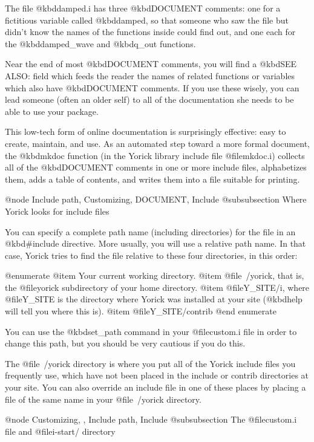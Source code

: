 {The file @kbd{damped.i} has three @kbd{DOCUMENT} comments: one for a
fictitious variable called @kbd{damped}, so that someone who saw the
file but didn't know the names of the functions inside could find out,
and one each for the @kbd{damped_wave} and @kbd{q_out} functions.


Near the end of most @kbd{DOCUMENT} comments, you will find a
@kbd{SEE ALSO:} field which feeds the reader the names of related
functions or variables which also have @kbd{DOCUMENT} comments.  If
you use these wisely, you can lead someone (often an older self) to
all of the documentation she needs to be able to use your package.

This low-tech form of online documentation is surprisingly effective:
easy to create, maintain, and use.  As an automated step toward a more
formal document, the @kbd{mkdoc} function (in the Yorick library include
file @file{mkdoc.i}) collects all of the @kbd{DOCUMENT} comments in one
or more include files, alphabetizes them, adds a table of contents, and
writes them into a file suitable for printing.


@node Include path, Customizing, DOCUMENT, Include
@subsubsection Where Yorick looks for include files

You can specify a complete path name (including directories) for the
file in an @kbd{#include} directive.  More usually, you will use a
relative path name.  In that case, Yorick tries to find the file
relative to these four directories, in this order:

@enumerate
@item
Your current working directory.
@item
@file{~/yorick}, that is, the @file{yorick} subdirectory of your home
directory.
@item
@file{Y_SITE/i}, where @file{Y_SITE} is the directory where
Yorick was installed at your site (@kbd{help} will tell you where
this is).
@item
@file{Y_SITE/contrib}
@end enumerate

You can use the @kbd{set_path} command in your @file{custom.i} file
in order to change this path, but you should be very cautious if you
do this.

The @file{~/yorick} directory is where you put all of the Yorick
include files you frequently use, which have not been placed in the
include or contrib directories at your site.  You can also override an
include file in one of these places by placing a file of the same name
in your @file{~/yorick} directory.


@node Customizing,  , Include path, Include
@subsubsection The @file{custom.i} file and @file{i-start/} directory

}
